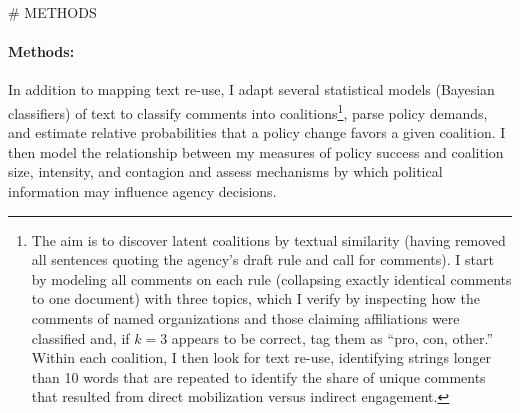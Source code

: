 # METHODS 
\paragraph{Methods:} In addition to mapping text re-use, I adapt several statistical models (Bayesian classifiers) of text to classify comments into coalitions\footnote{
The aim is to discover latent coalitions by textual similarity (having removed all sentences quoting the agency's draft rule and call for comments). I start by modeling all comments on each rule (collapsing exactly identical comments to one document) with three topics, which I verify by inspecting how the comments of named organizations and those claiming affiliations were classified and, if $k=3$ appears to be correct, tag them as ``pro, con, other.'' Within each coalition, I then look for text re-use, identifying strings longer than 10 words that are repeated to identify the share of unique comments that resulted from direct mobilization versus indirect engagement.
}, parse policy demands, and estimate relative probabilities that a policy change favors a given coalition. I then model the relationship between my measures of policy success and coalition size, intensity, and contagion and assess mechanisms
by which political information may influence agency decisions.
